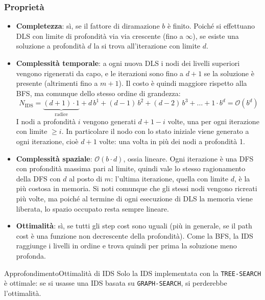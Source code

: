 \documentclass[a4paper, 11pt, oneside]{book}
\theoremstyle{definition}
\begin{document}
	\subsubsection*{Propriet\`a}
	\begin{itemize}
		\item \textbf{Completezza}: s\`i, se il fattore di diramazione $b$ \`e finito.
			Poich\'e si effettuano DLS con limite di profondit\`a via via crescente (fino a
			$\infty$), se esiste una soluzione a profondit\`a $d$ la si trova all'iterazione
			con limite $d$.

		\item \textbf{Complessit\`a temporale}: a ogni nuova DLS i nodi dei livelli
			superiori vengono rigenerati da capo, e le iterazioni sono fino a $d+1$ se la
			soluzione \`e presente (altrimenti fino a $m+1$). Il costo \`e quindi maggiore
			rispetto alla BFS, ma comunque dello stesso ordine di grandezza:
			\[
				N_{\text{IDS}} = \mathord{\underbrace{(d+1) \cdot 1}_{\text{radice}}} + d\,b^1
				+ (d-1)\,b^2 + (d-2)\,b^3 + \dots + 1 \cdot b^d = \mathcal{O}(b^d)
			\]
			I nodi a profondit\`a $i$ vengono generati $d + 1 - i$ volte, una per ogni
			iterazione con limite $\geq i$. In particolare il nodo con lo stato iniziale viene
			generato a ogni iterazione, cio\`e $d+1$ volte: una volta in pi\`u dei nodi a
			profondit\`a 1.

		\item \textbf{Complessit\`a spaziale}: $\mathcal{O}(b \cdot d)$, ossia lineare. Ogni
			iterazione \`e una DFS con profondit\`a massima pari al limite, quindi vale lo
			stesso ragionamento della DFS con $d$ al posto di $m$: l'ultima iterazione, quella
			con limite $d$, \`e la pi\`u costosa in memoria. Si noti comunque che gli stessi 
            nodi
			vengono ricreati pi\`u volte, ma poich\'e al termine di ogni esecuzione di DLS la
			memoria viene liberata, lo spazio occupato resta sempre lineare.

		\item \textbf{Ottimalit\`a}: s\`i, se tutti gli step cost sono uguali (pi\`u in
			generale, se il path cost \`e una funzione non decrescente della profondit\`a).
			Come la BFS, la IDS raggiunge i livelli in ordine e trova quindi per prima la
			soluzione meno profonda.
	\end{itemize}
    \begin{nota}
        {Approfondimento}{Ottimalit\`a di IDS}
        Solo la IDS implementata con la \texttt{TREE-SEARCH} \`e ottimale: se si usasse
        una IDS basata su \texttt{GRAPH-SEARCH}, si perderebbe l'ottimalit\`a.
    \end{nota}
\end{document}
